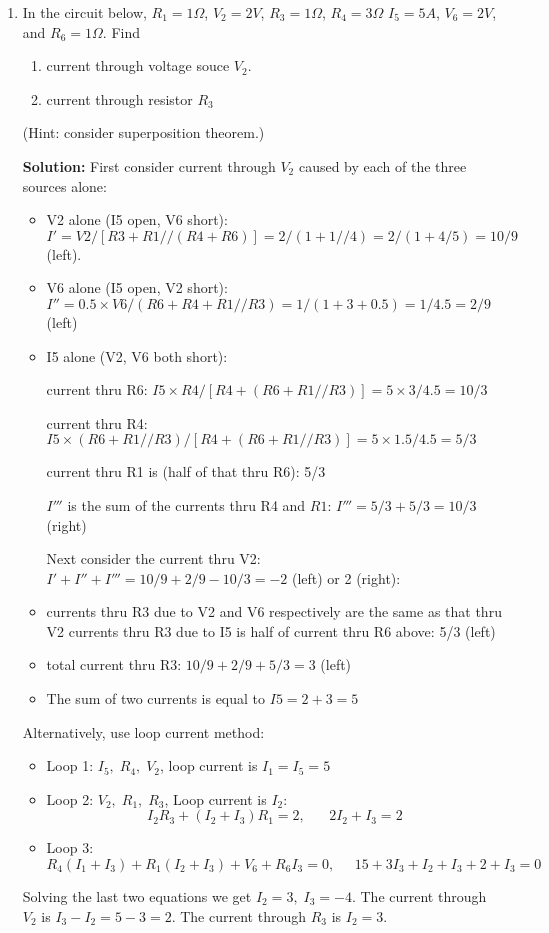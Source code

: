 \begin{enumerate}
\begin{enumerate}
\item In the circuit below, $R_1=1\Omega$, $V_2=2V$, $R_3=1\Omega$, $R_4=3\Omega$
  $I_5=5A$, $V_6=2V$, and $R_6=1\Omega$. Find
\begin{enumerate}
\item current through voltage souce $V_2$. 
\item current through resistor $R_3$
\end{enumerate}
(Hint: consider superposition theorem.)


{\bf Solution:}
First consider current through $V_2$ caused by each of the three 
sources alone:
\begin{itemize}
\item V2 alone (I5 open, V6 short): 
$I'=V2/[R3+R1//(R4+R6)]=2/(1+1//4)=2/(1+4/5)=10/9$ (left).
\item V6 alone (I5 open, V2 short): 
$I'' =0.5 \times V6/(R6+R4+R1//R3)=1/(1+3+0.5)=1/4.5=2/9$ (left)
\item I5 alone (V2, V6 both short): 

current thru R6: $I5\times R4/[R4+(R6+R1//R3)]=5\times 3/4.5=10/3$

current thru R4: $I5\times (R6+R1//R3)/[R4+(R6+R1//R3)]=5\times 1.5/4.5=5/3$

current thru R1 is (half of that thru R6): 5/3

$I'''$ is the sum of the currents thru R4 and $R1$: $I'''=5/3+5/3=10/3$
(right) 

Next consider the current thru V2: $I'+I''+I'''=10/9+2/9-10/3=-2$ (left) 
or 2 (right):

\item currents thru R3 due to V2 and V6 respectively are the same as that 
	thru V2 currents thru R3 due to I5 is half of current thru R6 above:
	5/3 (left)
\item total current thru R3: $10/9+2/9+5/3=3$ (left) 

\item The sum of two currents is equal to $I5=2+3=5$
\end{itemize}

Alternatively, use loop current method:
\begin{itemize}
\item Loop 1: $I_5,\;R_4,\;V_2$, loop current is $I_1=I_5=5$
\item Loop 2: $V_2,\;R_1,\;R_3$, Loop current is $I_2$:
  \[
  I_2R_3+(I_2+I_3)R_1=2,\;\;\;\;\;\;2I_2+I_3=2
  \]
\item Loop 3: 
  \[
  R_4(I_1+I_3)+R_1(I_2+I_3)+V_6+R_6I_3=0,\;\;\;\;\;
  15+3I_3+I_2+I_3+2+I_3=0
  \]
\end{itemize}
Solving the last two equations we get $I_2=3,\;I_3=-4$. The current through
$V_2$ is $I_3-I_2=5-3=2$. The current through $R_3$ is $I_2=3$.




\end{enumerate}
\end{enumerate}
